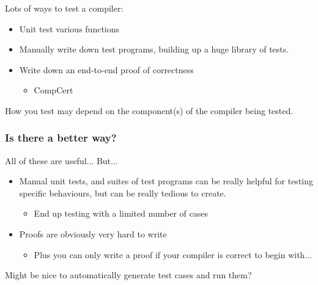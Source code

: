 \documentclass{beamer}
\begin{document}

\begin{frame}
  \frametitle{}

  Lots of ways to test a compiler:

  \begin{itemize}
  \item Unit test various functions
  \item Manually write down test programs, building up a huge library
    of tests.
  \item Write down an end-to-end proof of correctness
    \begin{itemize}
    \item CompCert
    \end{itemize}
  \end{itemize}

  How you test may depend on the component(s) of the compiler being
  tested.


  \pause
\end{frame}

\begin{frame}
  \frametitle{Is there a better way?}

  All of these are useful... But...
  
  \begin{itemize}
  \item Manual unit tests, and suites of test programs can be really
    helpful for testing specific behaviours, but can be really tedious
    to create.
    \begin{itemize}
    \item End up testing with a limited number of cases
    \end{itemize}
  \item Proofs are obviously very hard to write
    \begin{itemize}
    \item Plus you can only write a proof if your compiler is correct
      to begin with... %
    \end{itemize}
  \end{itemize}

  Might be nice to automatically generate test cases and run them?

\end{frame}
\end{document}
